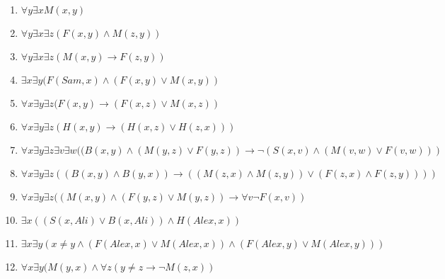 \documentclass[a4paper,12pt]{article}
\begin{document}
	\begin{tcolorbox}
		\begin{enumerate}
			\item $\forall y\exists x M(x,y)$
			\item $\forall y\exists x \exists z (F(x,y)\land M(z,y))$
			\item $\forall y\exists x\exists z (M(x,y)\rightarrow F(z,y))$
			\item $\exists x\exists y (F(Sam,x)\land(F(x,y)\lor M(x,y))$
			\item $\forall x\exists y\exists z (F(x,y)\rightarrow (F(x,z)\lor M(x,z))$
			\item $\forall x\exists y\exists z (H(x,y)\rightarrow(H(x,z)\lor H(z,x)))$
			\item $\forall x \exists y \exists z \exists v \exists w ((B(x,y)\land(M(y,z)\lor F(y,z))\rightarrow\neg(S(x,v)\land(M(v,w)\lor F(v,w)))$
			\item $\forall x \exists y\exists z ((B(x,y)\land B(y,x))\rightarrow((M(z,x)\land M(z,y))\lor(F(z,x)\land F(z,y))))$
			\item $\forall x\exists y\exists z ((M(x,y)\land(F(y,z)\lor M(y,z))\rightarrow\forall v\neg F(x,v))$
			\item $\exists x ((S(x,Ali)\lor B(x,Ali))\land H(Alex,x))$
			\item $\exists x \exists y (x\neq y \land (F(Alex,x)\lor M(Alex,x)) \land (F(Alex,y)\lor M(Alex,y)))$
			\item $\forall x\exists y (M(y,x) \land \forall z (y\neq z\rightarrow\neg M(z,x))$
		\end{enumerate}
	\end{tcolorbox}
	
	\newpage
\end{document}
